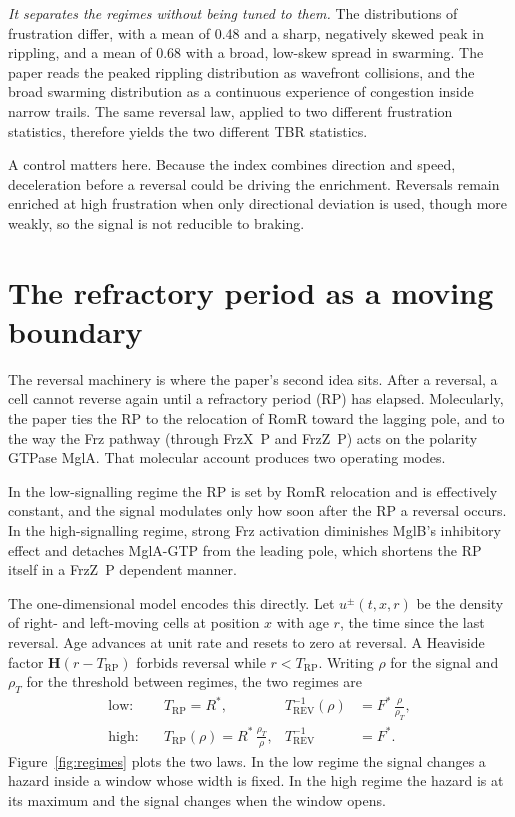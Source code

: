 \documentclass[11pt]{article}
\theoremstyle{definition}
\theoremstyle{remark}
\newcommand{\Trp}{T_{\mathrm{RP}}}
\newcommand{\Trev}{T_{\mathrm{REV}}}
\begin{document}
\emph{It separates the regimes without being tuned to them.} The distributions of frustration differ, with a mean of 0.48 and a sharp, negatively skewed peak in rippling, and a mean of 0.68 with a broad, low-skew spread in swarming. The paper reads the peaked rippling distribution as wavefront collisions, and the broad swarming distribution as a continuous experience of congestion inside narrow trails. The same reversal law, applied to two different frustration statistics, therefore yields the two different TBR statistics.

A control matters here. Because the index combines direction and speed, deceleration before a reversal could be driving the enrichment. Reversals remain enriched at high frustration when only directional deviation is used, though more weakly, so the signal is not reducible to braking.

\section{The refractory period as a moving boundary}

The reversal machinery is where the paper's second idea sits. After a reversal, a cell cannot reverse again until a refractory period (RP) has elapsed. Molecularly, the paper ties the RP to the relocation of RomR toward the lagging pole, and to the way the Frz pathway (through FrzX~P and FrzZ~P) acts on the polarity GTPase MglA. That molecular account produces two operating modes.

In the low-signalling regime the RP is set by RomR relocation and is effectively constant, and the signal modulates only how soon after the RP a reversal occurs. In the high-signalling regime, strong Frz activation diminishes MglB's inhibitory effect and detaches MglA-GTP from the leading pole, which shortens the RP itself in a FrzZ~P dependent manner.

The one-dimensional model encodes this directly. Let $u^{\pm}(t,x,r)$ be the density of right- and left-moving cells at position $x$ with age $r$, the time since the last reversal. Age advances at unit rate and resets to zero at reversal. A Heaviside factor $\mathbf{H}(r-\Trp)$ forbids reversal while $r<\Trp$. Writing $\rho$ for the signal and $\rho_T$ for the threshold between regimes, the two regimes are
\begin{align}
  \text{low:}\quad & \Trp = R^{*}, & \Trev^{-1}(\rho) &= F^{*}\,\frac{\rho}{\rho_T}, \\
  \text{high:}\quad & \Trp(\rho) = R^{*}\,\frac{\rho_T}{\rho}, & \Trev^{-1} &= F^{*}.
\end{align}
Figure~\ref{fig:regimes} plots the two laws. In the low regime the signal changes a hazard inside a window whose width is fixed. In the high regime the hazard is at its maximum and the signal changes when the window opens.
\end{document}
